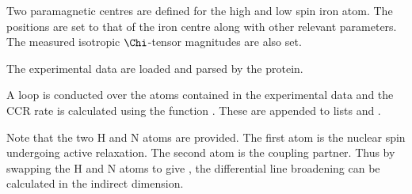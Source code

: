 \documentclass[a4paper,10pt,english]{sphinxmanual}
\begin{document}
Two paramagnetic centres are defined for the high and low spin iron atom. The positions are set to that of the iron centre along with other relevant parameters. The measured isotropic \({\Chi}\)-tensor magnitudes are also set.

%
\begin{sphinxVerbatim}[commandchars=\\\{\}]
   
  
  
  
\end{sphinxVerbatim}

The experimental data are loaded and parsed by the protein.

%
\begin{sphinxVerbatim}[commandchars=\\\{\}]
  
  
\end{sphinxVerbatim}

A loop is conducted over the atoms contained in the experimental data and the CCR rate is calculated using the function {\hyperref[\detokenize{reference/generated/paramagpy.metal.Metal.atom_ccr:paramagpy.metal.Metal.atom_ccr}]{}}. These are appended to lists  and .

Note that the two H and N atoms are provided. The first atom is the nuclear spin undergoing active relaxation. The second atom is the coupling partner. Thus by swapping the H and N atoms to give , the differential line broadening can be calculated in the indirect dimension.
\end{document}
